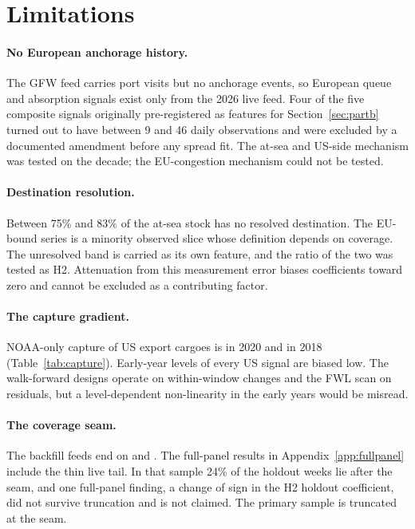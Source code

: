 \section{Limitations}\label{sec:limitations}

\paragraph{No European anchorage history.} The GFW feed carries port visits but no
anchorage events, so European queue and absorption signals exist only from the 2026
live feed. Four of the five composite signals originally pre-registered as features
for Section~\ref{sec:partb} turned out to have between 9 and 46 daily observations
and were excluded by a documented amendment before any spread fit. The at-sea and
US-side mechanism was tested on the decade; the EU-congestion mechanism could not
be tested.

\paragraph{Destination resolution.} Between 75\% and 83\% of the at-sea stock has no
resolved destination. The EU-bound series is a minority observed slice whose
definition depends on coverage. The unresolved band is carried as its own feature,
and the ratio of the two was tested as H2. Attenuation from this measurement error
biases coefficients toward zero and cannot be excluded as a contributing factor.

\paragraph{The capture gradient.} NOAA-only capture of US export cargoes is
\captureTwentyTwenty{} in 2020 and \captureTwentyEighteen{} in 2018
(Table~\ref{tab:capture}). Early-year levels of every US signal are biased low. The
walk-forward designs operate on within-window changes and the FWL scan on residuals,
but a level-dependent non-linearity in the early years would be misread.

\paragraph{The coverage seam.} The backfill feeds end on \noaaEnds{} and \gfwEnds.
The full-panel results in Appendix~\ref{app:fullpanel} include the thin live tail.
In that sample 24\% of the holdout weeks lie after the seam, and one full-panel
finding, a change of sign in the H2 holdout coefficient, did not survive truncation
and is not claimed. The primary sample is truncated at the seam.

